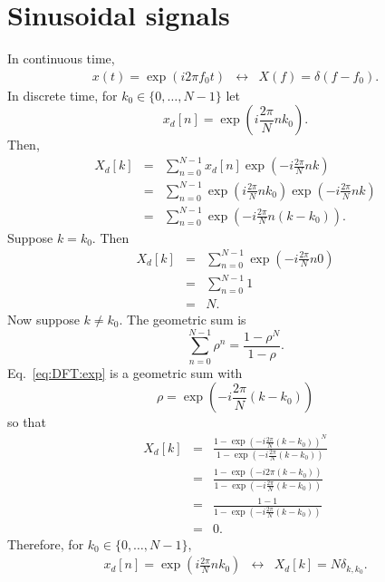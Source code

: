 \documentclass{article}
\begin{document}
\section{Sinusoidal signals}
In continuous time,
\begin{eqnarray}
x(t)=\exp(i2\pi f_0 t)
&\leftrightarrow&
X(f)=\delta(f-f_0)
\label{eq:continuoustime:sinusoid}
.
\end{eqnarray}
In discrete time, for $k_0\in\{0,\dots,N-1\}$ let
\begin{equation}
x_d[n]
=
\exp\left(i\frac{2\pi}{N} n k_0\right)
\label{eq:discretetime:sinusoid}
.
\end{equation}
Then,
\begin{eqnarray}
X_d[k]
&=&
\sum_{n=0}^{N-1} x_d[n] \exp\left(-i \frac{2\pi}{N} nk \right)
\\
&=&
\sum_{n=0}^{N-1}
\exp\left(i\frac{2\pi}{N} n k_0\right)
\exp\left(-i \frac{2\pi}{N} nk \right)
\\
&=&
\sum_{n=0}^{N-1}
\exp\left(-i\frac{2\pi}{N} n (k-k_0)\right)
\label{eq:DFT:exp}
.
\end{eqnarray}
Suppose $k=k_0$.
Then
\begin{eqnarray}
X_d[k]
&=&
\sum_{n=0}^{N-1}
\exp\left(-i\frac{2\pi}{N} n 0\right)
\\
&=&
\sum_{n=0}^{N-1}
1
\\
&=&
N
.
\end{eqnarray}
Now suppose $k\neq k_0$.
The geometric sum is
\begin{equation}
\sum_{n=0}^{N-1}
\rho^n
=
\frac{1-\rho^N}{1-\rho}
.
\end{equation}
Eq.~\ref{eq:DFT:exp} is a geometric sum with
\begin{equation}
\rho
=
\exp\left(-i\frac{2\pi}{N} (k-k_0)\right)
\end{equation}
so that
\begin{eqnarray}
X_d[k]
&=&
\frac{
1-\exp\left(-i\frac{2\pi}{N} (k-k_0)\right)^N
}{
1-\exp\left(-i\frac{2\pi}{N} (k-k_0)\right)
}
\\
&=&
\frac{
1-\exp\left(-i 2\pi (k-k_0)\right)
}{
1-\exp\left(-i\frac{2\pi}{N} (k-k_0)\right)
}
\\
&=&
\frac{
1-1
}{
1-\exp\left(-i\frac{2\pi}{N} (k-k_0)\right)
}
\\
&=&
0
.
\end{eqnarray}
Therefore, for $k_0\in\{0,\dots,N-1\}$,
\begin{eqnarray}
x_d[n]
=
\exp\left(i\frac{2\pi}{N} n k_0\right)
&\leftrightarrow&
X_d[k]
=
N \delta_{k,k_0}
.
\end{eqnarray}
\end{document}
